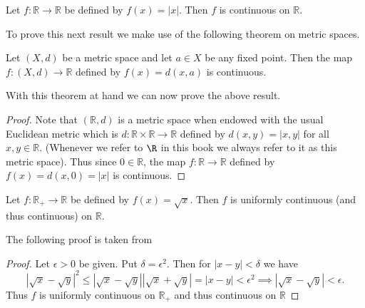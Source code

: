 	 \hrulefill
	 
	  \begin{result}
	  	Let $f : \mathbb{R} \to \mathbb{R}$ be defined by $f(x) = |x|$. Then $f$ is continuous on $\mathbb{R}$. 
	  \end{result}
	  
	  To prove this next result we make use of the following theorem on metric spaces.
	 
	 \begin{theorem}
	 	Let $(X, d)$ be a metric space and let $a \in X$ be any fixed point. Then the map $f : (X, d) \to \mathbb{R}$ defined by $f(x) = d(x, a)$ is continuous.
	 \end{theorem}
	 
	 With this theorem at hand we can now prove the above result.
	 
	 \begin{proof}
	 	Note that $(\mathbb{R}, d)$ is a metric space when endowed with the usual Euclidean metric which is $d : \mathbb{R} \times \mathbb{R} \to \mathbb{R}$ defined by $d(x, y) = |x, y|$ for all $x, y \in \mathbb{R}$. (Whenever we refer to $\R$ in this book we always refer to it as this metric space). Thus since $0 \in \mathbb{R}$, the map $f : \mathbb{R} \to \mathbb{R}$ defined by $f(x) = d(x, 0) = |x|$ is continuous.
	 \end{proof}
	 
	 	 \hrulefill
	 	 
	 	 \medskip
	 	 
	 \begin{result}
	 		Let $f : \mathbb{R_{+}} \to \mathbb{R}$ be defined by $f(x) = \sqrt{x}$. Then $f$ is uniformly continuous (and thus continuous) on $\mathbb{R}$. 
	 \end{result}
	 
	 The following proof is taken from \cite{sqrtx}
	 
	 \begin{proof}
	 	Let $\epsilon > 0$ be given. Put $\delta = \epsilon^2$. Then for $|x-y| < \delta$ we have  $$|\sqrt x - \sqrt y|^2 \leq |\sqrt x - \sqrt y||\sqrt x + \sqrt y| = |x-y| < \epsilon^2 \implies |\sqrt x - \sqrt y| < \epsilon. $$ Thus $f$ is uniformly continuous on $\mathbb{R}_{+}$ and thus continuous on $\mathbb{R}$
	 \end{proof}

	 
	 